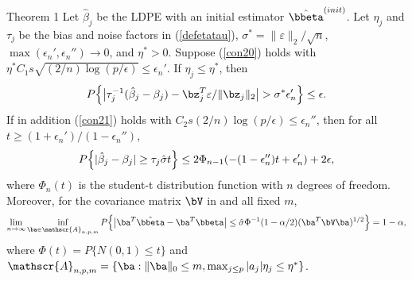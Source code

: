 \begin{frame}%
\begin{block}{Theorem 1}
\scriptsize
Let $\hat{\beta}_j$ be the LDPE with an initial estimator $\hat{\bbeta}^{(init)}$.
Let $\eta_j$ and $\tau_j$ be the bias and noise factors in (\ref{defetatau}),
$\sigma^*=\|\varepsilon\|_2/\sqrt{n}$,
$\max(\epsilon_n',\epsilon_n'')\to 0$, and $\eta^*>0$.
Suppose (\ref{con20}) holds with $\eta^*C_1s\sqrt{(2/n)\log(p/\epsilon)} \leq \epsilon_n'$.
If $\eta_j \leq \eta^*$, then
\begin{equation}
\setlength{\abovedisplayskip}{3pt}
\setlength{\belowdisplayskip}{3pt}
\label{thm22}
P\Big\{ \big|\tau_j^{-1}(\hat{\beta}_j - \beta_j) - \bz_j^T \varepsilon/\|\bz_j\|_2\big|
> \sigma^* \epsilon_n'\Big\} \leq \epsilon.
\end{equation}
If in addition (\ref{con21}) holds with $C_2 s (2/n)\log(p/\epsilon)\leq \epsilon_n''$, then for all
$t\ge (1+\epsilon_n')/(1-\epsilon_n'')$,
\begin{equation}
\setlength{\abovedisplayskip}{3pt}
\setlength{\belowdisplayskip}{3pt}
\label{thm23}
P\Big\{|\hat{\beta}_j - \beta_j| \ge \tau_j \hat{\sigma} t \Big\} \leq 2\Phi_{n-1}(-(1-\epsilon_n'')t+\epsilon_n')+2\epsilon,
\end{equation}
where $\Phi_n(t)$ is the student-t distribution function with $n$ degrees of freedom.
Moreover, for the covariance matrix $\bV$ in and all fixed $m$,
\begin{equation}
\setlength{\abovedisplayskip}{3pt} %
\setlength{\belowdisplayskip}{3pt}
\label{thm24}
\lim_{n\to\infty}
\inf_{\ba\in \mathscr{A}_{n,p,m}}P\Big\{\big|\ba^T\hat{\bbeta} - \ba^T\bbeta\big|
\leq \hat{\sigma}\Phi^{-1}(1-\alpha/2)(\ba^T\bV\ba)^{1/2}\Big\} = 1-\alpha,
\end{equation}
where $\Phi(t) = P\{ N(0,1)\le t\}$ and
$\mathscr{A}_{n,p,m}=\{\ba: \|\ba\|_0 \leq m, \max_{j \leq p}|a_j|\eta_j\leq \eta^*\}$.
\end{block}

\end{frame}



